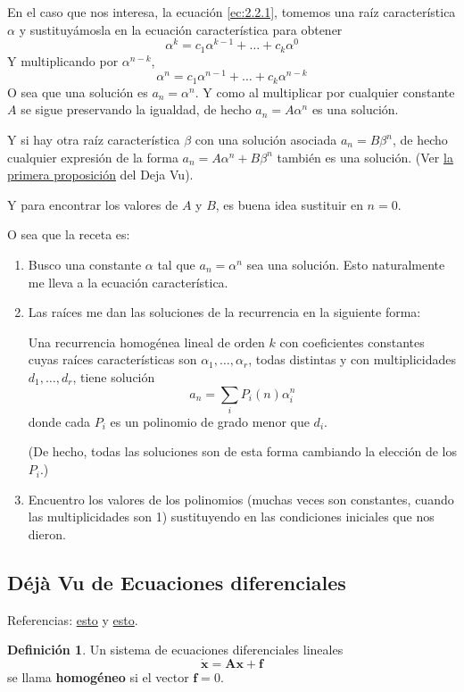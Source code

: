 \documentclass[spanish]{book}
\theoremstyle{definition}
\newtheorem*{defn}{Definición}
\begin{document}
	En el caso que nos interesa, la ecuación \eqref{ec:2.2.1}, tomemos una raíz característica $\alpha$ y sustituyámosla en la ecuación característica para obtener
	\[\alpha^k=c_1\alpha^{k-1}+\ldots+c_k\alpha^{0}\]
	Y multiplicando por $\alpha^{n-k}$,
	\[\alpha^n=c_1\alpha^{n-1}+\ldots+c_k\alpha^{n-k}\]
	O sea que una solución es $a_n=\alpha^n$. Y como al multiplicar por cualquier constante $A$ se sigue preservando la igualdad, de hecho $a_n=A\alpha^n$ es una solución.
	
	Y si hay otra raíz característica $\beta$ con una solución asociada $a_n=B\beta^n$, de hecho cualquier expresión de la forma $a_n=A\alpha^n+B\beta^n$ también es una solución. (Ver \hyperref[prop:2.2.2.1.1]{la primera proposición} del Deja Vu).
	
	Y para encontrar los valores de $A$ y $B$, es buena idea sustituir en $n=0$.
	
	O sea que la receta es:
	\begin{enumerate}
		\item Busco una constante $\alpha$ tal que $a_n=\alpha^n$ sea una solución. Esto naturalmente me lleva a la ecuación característica.
		\item Las raíces me dan las soluciones de la recurrencia en la siguiente forma:
	\begin{teo}
		Una recurrencia homogénea lineal de orden $k$ con coeficientes constantes cuyas raíces características son $\alpha_1,\ldots,\alpha_r$, todas distintas y con multiplicidades $d_1,\ldots,d_r$, tiene solución
		\[a_n=\sum_iP_i(n)\alpha_i^n\]
		donde cada $P_i$ es un polinomio de grado menor que $d_i$.
	\end{teo}
	(De hecho, todas las soluciones son de esta forma cambiando la elección de los $P_i$.)
	\item Encuentro los valores de los polinomios (muchas veces son constantes, cuando las multiplicidades son 1) sustituyendo en las condiciones iniciales que nos dieron.
\end{enumerate}	

\iffalse
\subsection{Déjà Vu de Ecuaciones diferenciales}
	Referencias: \href{http://www.cds.caltech.edu/~murray/courses/cds101/fa02/precourse/delvecchio-26sep02.pdf}{esto} y \href{https://tutorial.math.lamar.edu/Classes/DE/SolutionsToSystems.aspx#mjx-eqn-eqeq1}{esto}.
	\begin{defn}Un sistema de ecuaciones diferenciales lineales
	\begin{equation}\label{ec:2.2.1.1}
		\dot{\mathbf{x}}=\mathbf{A}\mathbf{x}+\mathbf{f}
	\end{equation}
	se llama \textbf{homogéneo} si el vector $\mathbf{f}=0$.
	\end{defn}
\end{document}
